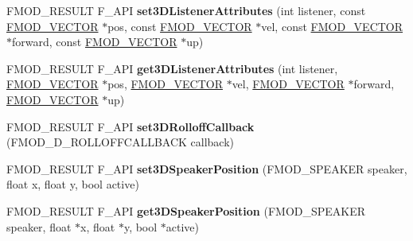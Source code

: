 \begin{DoxyCompactItemize}
\item 
\hypertarget{class_f_m_o_d_1_1_system_a0e24af3c714aab78000e13cf522a3bfc}{F\-M\-O\-D\-\_\-\-R\-E\-S\-U\-L\-T F\-\_\-\-A\-P\-I {\bfseries set3\-D\-Listener\-Attributes} (int listener, const \hyperlink{struct_f_m_o_d___v_e_c_t_o_r}{F\-M\-O\-D\-\_\-\-V\-E\-C\-T\-O\-R} $\ast$pos, const \hyperlink{struct_f_m_o_d___v_e_c_t_o_r}{F\-M\-O\-D\-\_\-\-V\-E\-C\-T\-O\-R} $\ast$vel, const \hyperlink{struct_f_m_o_d___v_e_c_t_o_r}{F\-M\-O\-D\-\_\-\-V\-E\-C\-T\-O\-R} $\ast$forward, const \hyperlink{struct_f_m_o_d___v_e_c_t_o_r}{F\-M\-O\-D\-\_\-\-V\-E\-C\-T\-O\-R} $\ast$up)}\label{class_f_m_o_d_1_1_system_a0e24af3c714aab78000e13cf522a3bfc}

\item 
\hypertarget{class_f_m_o_d_1_1_system_af141ec87d96230c1c445d6e3c2de224a}{F\-M\-O\-D\-\_\-\-R\-E\-S\-U\-L\-T F\-\_\-\-A\-P\-I {\bfseries get3\-D\-Listener\-Attributes} (int listener, \hyperlink{struct_f_m_o_d___v_e_c_t_o_r}{F\-M\-O\-D\-\_\-\-V\-E\-C\-T\-O\-R} $\ast$pos, \hyperlink{struct_f_m_o_d___v_e_c_t_o_r}{F\-M\-O\-D\-\_\-\-V\-E\-C\-T\-O\-R} $\ast$vel, \hyperlink{struct_f_m_o_d___v_e_c_t_o_r}{F\-M\-O\-D\-\_\-\-V\-E\-C\-T\-O\-R} $\ast$forward, \hyperlink{struct_f_m_o_d___v_e_c_t_o_r}{F\-M\-O\-D\-\_\-\-V\-E\-C\-T\-O\-R} $\ast$up)}\label{class_f_m_o_d_1_1_system_af141ec87d96230c1c445d6e3c2de224a}

\item 
\hypertarget{class_f_m_o_d_1_1_system_a10491361e22c3fa6968e1ed43ca42dc5}{F\-M\-O\-D\-\_\-\-R\-E\-S\-U\-L\-T F\-\_\-\-A\-P\-I {\bfseries set3\-D\-Rolloff\-Callback} (F\-M\-O\-D\-\_\-D\-\_\-\-R\-O\-L\-L\-O\-F\-F\-C\-A\-L\-L\-B\-A\-C\-K callback)}\label{class_f_m_o_d_1_1_system_a10491361e22c3fa6968e1ed43ca42dc5}

\item 
\hypertarget{class_f_m_o_d_1_1_system_ab2f8b73ae39bf546ec187d9fef30de83}{F\-M\-O\-D\-\_\-\-R\-E\-S\-U\-L\-T F\-\_\-\-A\-P\-I {\bfseries set3\-D\-Speaker\-Position} (F\-M\-O\-D\-\_\-\-S\-P\-E\-A\-K\-E\-R speaker, float x, float y, bool active)}\label{class_f_m_o_d_1_1_system_ab2f8b73ae39bf546ec187d9fef30de83}

\item 
\hypertarget{class_f_m_o_d_1_1_system_a49c0fcb3f0c3c0fb8c19c809b418ede3}{F\-M\-O\-D\-\_\-\-R\-E\-S\-U\-L\-T F\-\_\-\-A\-P\-I {\bfseries get3\-D\-Speaker\-Position} (F\-M\-O\-D\-\_\-\-S\-P\-E\-A\-K\-E\-R speaker, float $\ast$x, float $\ast$y, bool $\ast$active)}\label{class_f_m_o_d_1_1_system_a49c0fcb3f0c3c0fb8c19c809b418ede3}


\end{DoxyCompactItemize}
